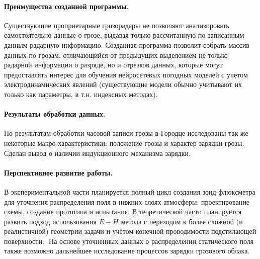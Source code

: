 \documentclass[a4paper,14pt]{extarticle}
\newcommand{\numb}[1]{\,\scalebox{0.8}{\textbf{(#1)}}\,}
\begin{document}
\paragraph{Преимущества созданной программы.} Существующие проприетарные грозорадары не позволяют анализировать самостоятельно данные о грозе, выдавая только рассчитанную по записанным данным радарную информацию. Созданная программа позволит собрать массив данных по грозам, отличающийся от предыдущих выделением не только радарной информации о разряде, но и отрезков данных, которые могут предоставлять интерес для обучения нейросетевых погодных моделей с учетом электродинамических явлений (существующие модели обычно учитывают их только как параметры, в т.н. индексных методах).

\vspace{-1em}
\paragraph{Результаты обработки данных.} По результатам обработки часовой записи грозы в Городце исследованы так же некоторые макро-характеристики: положение грозы и характер зарядки грозы. Сделан вывод о наличии индукционного механизма зарядки.

\vspace{-1em}
\paragraph{Перспективное развитие работы.}  В экспериментальной части планируется полный цикл создания зонд-флюксметра для уточнения распределения поля в нижних слоях атмосферы: проектирование схемы, создание прототипа и испытания. В теоретической части планируется \numb{1} развить подход использования $E-H$ метода с переходом к более сложной (и реалистичной) геометрии задачи и учётом конечной проводимости подстилающей поверхности.
\numb{2}На основе уточненных данных о распределении статического поля также возможно дальнейшее исследование процессов  зарядки грозового облака. 
\end{document}
